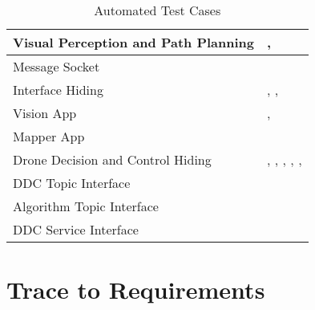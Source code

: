 \documentclass[12pt, titlepage]{article}
\begin{document}
\begin{table}[!h]
\begin{center}
\caption {Automated Test Cases}
\label{tab:automatedTestCases}
\begin{tabular}{ | m{9.2cm} | m{6.2cm} | } 
\hline
Visual Perception and Path Planning & \nameref{tab:STC_015}, \nameref{tab:STC_016} \\ 
\hline
Message Socket & \nameref{tab:UTC_007} \\ 
\hline
Interface Hiding & \nameref{tab:UTC_008}, \nameref{tab:UTC_009}, \nameref{tab:UTC_010} \\ 
\hline
Vision App & \nameref{tab:UTC_011}, \nameref{tab:UTC_012} \\ 
\hline
Mapper App & \nameref{tab:UTC_013} \\ 
\hline
Drone Decision and Control Hiding & \nameref{tab:UTC_014}, \nameref{tab:UTC_015}, \nameref{tab:UTC_016}, \nameref{tab:UTC_017}, \nameref{tab:UTC_018}, \nameref{tab:UTC_019} \\ 
\hline
DDC Topic Interface & \nameref{tab:UTC_020} \\ 
\hline
Algorithm Topic Interface & \nameref{tab:UTC_021} \\ 
\hline
DDC Service Interface & \nameref{tab:UTC_022} \\ 
\hline
\end{tabular}
\end{center}
\end{table}

\clearpage


		
\section{Trace to Requirements}
\end{document}
